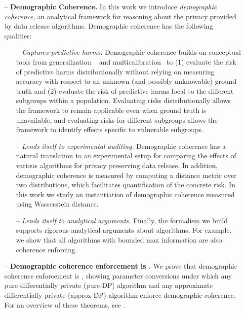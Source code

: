 \ifnum{}
\else
\begin{itemize}[--,leftmargin=*]
\fi

\ifnum{}
\smallskip
\noindent
\else
\item[--] 
\fi \textbf{Demographic Coherence.} In this work we introduce \emph{demographic coherence}, an analytical framework for reasoning about the privacy provided by data release algorithms. Demographic coherence has the following qualities:
\begin{itemize}
\item[--] \emph{Captures predictive harms.} Demographic coherence builds on conceptual tools from generalization ~\cite{vapnik1971, DworkFHPRR15, CummingsLNRW16, ImpLPS22, BunGHILPSS23} and multicalibration~\cite{HebertJohnsonKRR18, KimGZ19} to 
(1) evaluate the risk of predictive harms distributionally without relying on measuring accuracy with respect to an unknown (and possibly unknowable) ground truth and (2) evaluate the risk of predictive harms local to the different subgroups within a population. Evaluating risks distributionally allows the framework to remain applicable even when ground truth is unavailable, and evaluating risks for different subgroups allows the framework to identify effects specific to vulnerable subgroups.

\item[--] \emph{Lends itself to experimental auditing.} Demographic coherence has a natural translation to an experimental setup for comparing the effects of various algorithms for privacy preserving data release. 
In addition, demographic coherence is measured by computing a distance metric over two distributions, which facilitates quantification of the concrete risk. In this work we study an instantiation of demographic coherence measured using Wasserstein distance.

\item[--] \emph{Lends itself to analytical arguments.} Finally, the formalism we build supports rigorous analytical arguments about algorithms. For example, 
we show that all algorithms with bounded max information are also coherence enforcing.
\end{itemize}

\ifnum{}
\smallskip
\noindent
\else
\item[--] 
\fi
\textbf{Demographic coherence enforcement is .} 
We prove that demographic coherence enforcement is ,
showing parameter conversions under which any pure differentially private (pure-DP) algorithm and any approximate differentially private (approx-DP) algorithm enforce demographic coherence. For an overview of these theorems, see .

\ifnum{}
\else
\end{itemize}
\fi
    